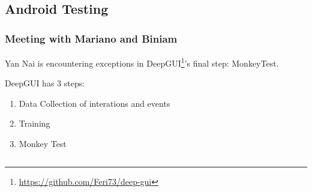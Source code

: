 \subsection{Android Testing}
\label{task:20231213_androidtesting}

\subsubsection{Meeting with Mariano and Biniam}

Yan Nai is encountering exceptions in DeepGUI\footnote{\url{https://github.com/Feri73/deep-gui}}'s final step: MonkeyTest.

DeepGUI has 3 steps:
\begin{enumerate}
\item Data Collection of interations and events
\item Training
\item Monkey Test
\end{enumerate}

\begin{lstlisting}

\end{lstlisting}